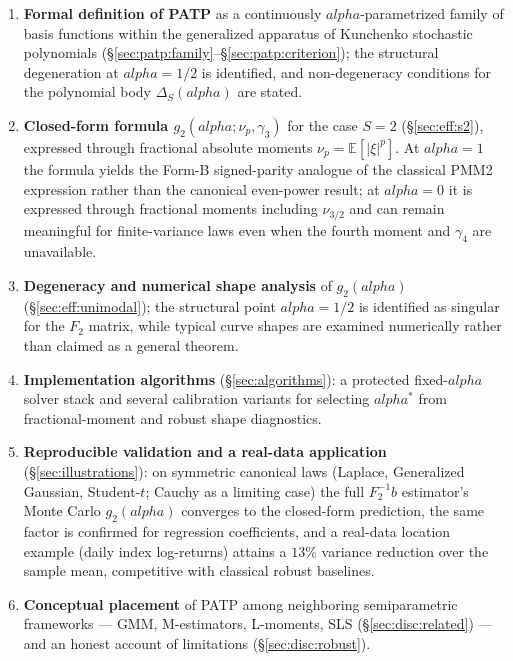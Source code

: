 \documentclass[11pt]{article}
\def\alpha{alpha}%
\def\vec#1{#1}%
\def\mathbf#1{#1}%
\def\tfrac#1#2{#1/#2}%
\theoremstyle{definition}
\newcommand{\E}{\mathbb{E}}
\begin{document}
\begin{enumerate}
  \item \textbf{Formal definition of PATP} as a continuously
        $\alpha$-parametrized family of basis functions within the
        generalized apparatus of Kunchenko stochastic polynomials
        (\S\ref{sec:patp:family}--\S\ref{sec:patp:criterion}); the structural
        degeneration at $\alpha = \tfrac{1}{2}$ is identified, and
        non-degeneracy conditions for the polynomial body
        $\Delta_S(\alpha)$ are stated.

  \item \textbf{Closed-form formula $g_2(\alpha; \nu_p, \gamma_3)$} for
        the case $S = 2$ (\S\ref{sec:eff:s2}), expressed through fractional
        absolute moments $\nu_p = \E[|\xi|^p]$. At $\alpha = 1$ the formula
        yields the Form-B signed-parity analogue of the classical PMM2
        expression rather than the canonical even-power result; at
        $\alpha = 0$ it is expressed through fractional moments including
        $\nu_{3/2}$ and can remain meaningful for finite-variance laws even
        when the fourth moment and $\gamma_4$ are unavailable.

  \item \textbf{Degeneracy and numerical shape analysis} of $g_2(\alpha)$
        (\S\ref{sec:eff:unimodal}); the structural point
        $\alpha = \tfrac{1}{2}$ is identified as singular for the
        $\mathbf{F}_2$ matrix, while typical curve shapes are examined
        numerically rather than claimed as a general theorem.

  \item \textbf{Implementation algorithms} (\S\ref{sec:algorithms}):
        a protected fixed-$\alpha$ solver stack and several calibration
        variants for selecting $\alpha^*$ from fractional-moment and robust
        shape diagnostics.

  \item \textbf{Reproducible validation and a real-data application}
        (\S\ref{sec:illustrations}): on symmetric canonical laws (Laplace,
        Generalized Gaussian, Student-$t$; Cauchy as a limiting case) the full
        $\mathbf{F}_2^{-1}\vec b$ estimator's Monte Carlo $g_2(\alpha)$ converges
        to the closed-form prediction, the same factor is confirmed for
        regression coefficients, and a real-data location example (daily index
        log-returns) attains a $13\%$ variance reduction over the sample mean,
        competitive with classical robust baselines.

  \item \textbf{Conceptual placement} of PATP among neighboring
        semiparametric frameworks --- GMM, M-estimators, L-moments,
        SLS (\S\ref{sec:disc:related}) --- and an honest account of
        limitations (\S\ref{sec:disc:robust}).
\end{enumerate}
\end{document}
